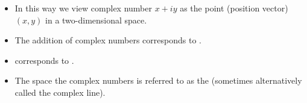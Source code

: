 \begin{frame}
\begin{itemize}
\item<10-> In this way we view complex number $x+iy$ as the point (position vector) $(x,y)$ in a two-dimensional space.
\item<11-> The addition of complex numbers corresponds to .
\item<14->  corresponds to .
\item<17-> The space the complex numbers is referred to as the  (sometimes alternatively called the complex line).
\end{itemize}
\end{frame}
